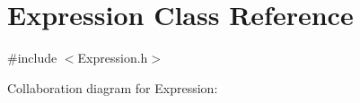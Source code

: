 \hypertarget{classExpression}{}\section{Expression Class Reference}
\label{classExpression}


{\ttfamily \#include $<$Expression.\+h$>$}



Collaboration diagram for Expression\+:
